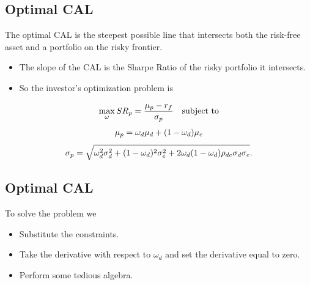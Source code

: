 \documentclass[letterpaper,10pt,english]{sphinxmanual}
\begin{document}
\subsection{Optimal CAL}
\label{portfolioOpt:optimal-cal}
The optimal CAL is the steepest possible line that intersects both the
risk-free asset and a portfolio on the risky frontier.
\begin{itemize}
\item {} 
The slope of the CAL is the Sharpe Ratio of the risky portfolio it
intersects.

\end{itemize}
\begin{itemize}
\item {} 
So the investor's optimization problem is

\end{itemize}
\begin{gather}
\begin{split}\max_{\omega} SR_p = \frac{\mu_p - r_f}{\sigma_p} \quad \text{subject to}\end{split}\notag
\end{gather}\begin{gather}
\begin{split}\mu_p = \omega_d \mu_d + (1-\omega_d) \mu_e\end{split}\notag
\end{gather}\begin{gather}
\begin{split}\sigma_p = \sqrt{\omega^2_d \sigma^2_d + (1-\omega_d)^2
\sigma^2_e + 2 \omega_d (1-\omega_d) \rho_{de} \sigma_d
\sigma_e}.\end{split}\notag
\end{gather}

\subsection{Optimal CAL}
\label{portfolioOpt:id6}
To solve the problem we
\begin{itemize}
\item {} 
Substitute the constraints.

\end{itemize}
\begin{itemize}
\item {} 
Take the derivative with respect to $\omega_d$ and set the
derivative equal to zero.

\end{itemize}
\begin{itemize}
\item {} 
Perform some tedious algebra.

\end{itemize}
\end{document}
